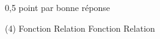 %
%
    0,5 point par bonne réponse
    \begin{tasks}(4)
        \task Fonction
        \task Relation
        \task Fonction
        \task Relation
    \end{tasks}
